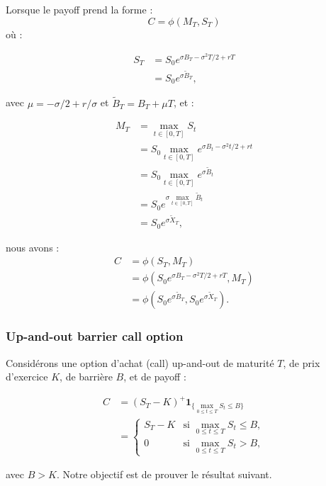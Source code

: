 \documentclass[11pt]{article}
\begin{document}
Lorsque le payoff prend la forme :
\begin{equation}
C = \phi(M_T, S_T)
\end{equation}
où : 
\begin{center}
\begin{align*}
S_T &= S_0 e^{\sigma B_T - \sigma^2 T / 2 + rT} \\
&= S_0 e^{\sigma \tilde{B}_T},
\end{align*}
\end{center}
avec $\mu = -\sigma/2 + r/\sigma$ et $\tilde{B}_T = B_T + \mu T$, et :

\begin{center}
\begin{align*}
M_T &= \max_{t \in [0,T]} S_t  \\
&= S_0 \max_{t \in [0,T]} e^{\sigma B_t - \sigma^2 t / 2 + rt} \\
&= S_0 \max_{t \in [0,T]} e^{\sigma \tilde{B}_t}  \\
&= S_0 e^{\sigma \max_{t \in [0,T]} \tilde{B}_t}  \\
&= S_0 e^{\sigma \tilde{X}_T},
\end{align*}
\end{center}

nous avons :
\begin{align*}
C &= \phi(S_T, M_T)  \\
&= \phi(S_0 e^{\sigma B_T - \sigma^2 T / 2 + rT}, M_T)  \\
&= \phi(S_0 e^{\sigma \tilde{B}_T}, S_0 e^{\sigma \tilde{X}_T}).
\end{align*}

\subsubsection{Up-and-out barrier call option}

Considérons une option d'achat (call) up-and-out de maturité $T$, de prix d'exercice $K$, de barrière $B$, et de payoff :

\begin{align*}
C &= (S_T - K)^+ \mathbf{1}_{\{ \max_{0 \le t \le T} S_t \le B \}} \\
&= \begin{cases} 
S_T - K & \text{si } \max_{0 \le t \le T} S_t \le B, \\
0 & \text{si } \max_{0 \le t \le T} S_t > B,
\end{cases}
\end{align*}

avec $B > K$. Notre objectif est de prouver le résultat suivant.
\end{document}
